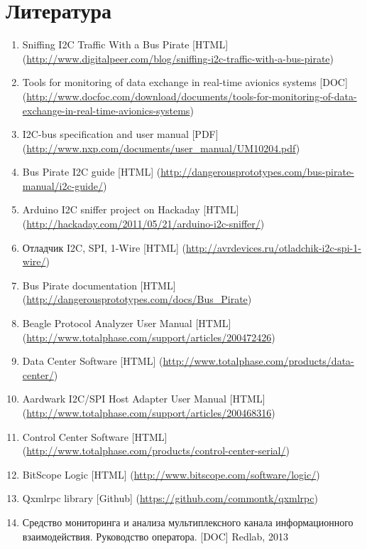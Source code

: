 \section{Литература}

\begin{enumerate}
 \sloppy
 \item \label{i2c_sniffing} Sniffing I2C Traffic With a Bus Pirate [HTML] (\url{http://www.digitalpeer.com/blog/sniffing-i2c-traffic-with-a-bus-pirate})
 \item \label{monitoring_tools} Tools for monitoring of data exchange in real-time avionics systems [DOC] (\url{http://www.docfoc.com/download/documents/tools-for-monitoring-of-data-exchange-in-real-time-avionics-systems})
 \item \label{i2c_protocol_spec} I2C-bus specification and user manual [PDF] (\url{http://www.nxp.com/documents/user_manual/UM10204.pdf})
 \item \label{buspirate_i2c} Bus Pirate I2C guide [HTML] (\url{http://dangerousprototypes.com/bus-pirate-manual/i2c-guide/})
 \item \label{arduino-i2c-sniffer} Arduino I2C sniffer project on Hackaday [HTML] (\url{http://hackaday.com/2011/05/21/arduino-i2c-sniffer/})
 \item \label{i2c-spi-1w-debugger} Отладчик I2C, SPI, 1-Wire [HTML] (\url{http://avrdevices.ru/otladchik-i2c-spi-1-wire/})
 \item \label{buspirate_descr} Bus Pirate documentation [HTML] (\url{http://dangerousprototypes.com/docs/Bus_Pirate})
 \item \label{beagle_protocol_analyzer} Beagle Protocol Analyzer User Manual [HTML] (\url{http://www.totalphase.com/support/articles/200472426})
 \item \label{tp_data_center} Data Center Software [HTML] (\url{http://www.totalphase.com/products/data-center/})
 \item \label{aardwark_adapter} Aardwark I2C/SPI Host Adapter User Manual [HTML] (\url{http://www.totalphase.com/support/articles/200468316})
 \item \label{tp_control_center} Control Center Software [HTML] (\url{http://www.totalphase.com/products/control-center-serial/})
 \item \label{bitscope_logic} BitScope Logic [HTML] (\url{http://www.bitscope.com/software/logic/})
 \item \label{qxmlrpc} Qxmlrpc library [Github] (\url{https://github.com/commontk/qxmlrpc})
 \item \label{sma_manual} Средство мониторинга и анализа мультиплексного канала информационного взаимодействия. Руководство оператора. [DOC] Redlab, 2013

\end{enumerate}
